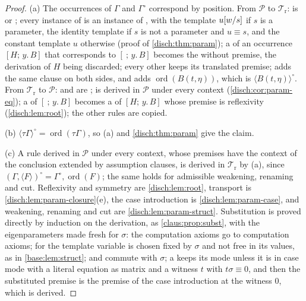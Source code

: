 \begin{proof}
(a) The occurrences of $\Gamma$ and $\Gamma^{\circ}$ correspond by
position. From $\mathcal P$ to $\mathcal T_{\mathrm r}$: 
is  or ; every instance of  is an
instance of , with the template $u[w/s]$ if $s$ is a
parameter, the identity template if $s$ is not a parameter and $u\equiv s$,
and the constant template $u$ otherwise (proof of \cref{disch:thm:param});
a  of an occurrence $[H;\,y.\,B]$ that corresponds to
$[\ ;\,y.\,B]$ becomes the  without premise, the derivation
of $H$ being discarded; every other  keeps its translated
premise;  adds the same clause on both sides, and
 adds $\operatorname{ord}(B(t,\eta))$, which is
$\langle B(t,\eta)\rangle^{\circ}$. From $\mathcal T_{\mathrm r}$ to
$\mathcal P$:  and  are ;
 is derived in $\mathcal P$ under every context
(\cref{disch:cor:param-eq}); a  of $[\ ;\,y.\,B]$ becomes a
 of $[H;\,y.\,B]$ whose premise is reflexivity
(\cref{disch:lem:root}); the other rules are copied.

(b) $\langle\tau\Gamma\rangle^{\circ}=\operatorname{ord}(\tau\Gamma)$, so
(a) and \cref{disch:thm:param} give the claim.

(c) A rule derived in $\mathcal P$ under every context, whose premises have
the context of the conclusion extended by assumption clauses, is derived
in $\mathcal T_{\mathrm r}$ by (a), since
$(\Gamma,\langle F\rangle)^{\circ}=\Gamma^{\circ},\operatorname{ord}(F)$;
the same holds for admissible weakening, renaming and cut. Reflexivity and
symmetry are \cref{disch:lem:root}, transport is
\cref{disch:lem:param-closure}(e), the case introduction is
\cref{disch:lem:param-case}, and weakening, renaming and cut are
\cref{disch:lem:param-struct}. Substitution is proved directly by induction
on the derivation, as \cref{claus:prop:subst}, with the eigenparameters made
fresh for $\sigma$: the computation axioms go to computation axioms; for
 the template variable is chosen fixed by $\sigma$ and not free
in its values, as in \cref{base:lem:struct};  and
 commute with $\sigma$; a  keeps its mode
unless it is in case mode with a literal equation as matrix and a witness
$t$ with $t\sigma\equiv 0$, and then the substituted premise is the premise
of the case introduction at the witness $0$, which is derived.
\end{proof}

